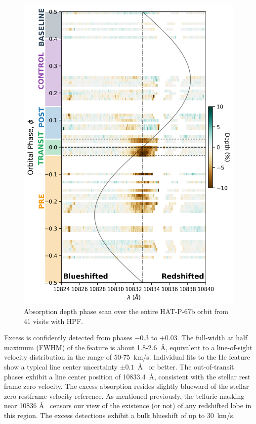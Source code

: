 \documentclass[twocolumn]{aastex631}
\begin{document}
\begin{figure}
    \includegraphics[width=\linewidth]{figures/phase_2D_diagram_resid.png}
    \caption{Absorption depth phase scan over the entire HAT-P-67b orbit from 41 visits with HPF.  }
    \label{fig:HPFscanResid}
\end{figure}

Excess is confidently detected from phases $-$0.3 to $+$0.03.  The full-width at half maximum (FWHM) of the feature is about 1.8-2.6~\AA, equivalent to a line-of-sight velocity distribution in the range of 50-75~km/s.  Individual fits to the He feature show a typical line center uncertainty $\pm0.1$~\AA~ or better.  The out-of-transit phases exhibit a line center position of 10833.4~\AA, consistent with the stellar  rest frame zero velocity.  The excess absorption resides slightly blueward of the stellar zero restframe velocity reference.  As mentioned previously, the telluric masking near 10836 \AA~ censors our view of the existence (or not) of any redshifted lobe in this region.  The excess detections exhibit a bulk blueshift of up to 30~km/s.
\end{document}
